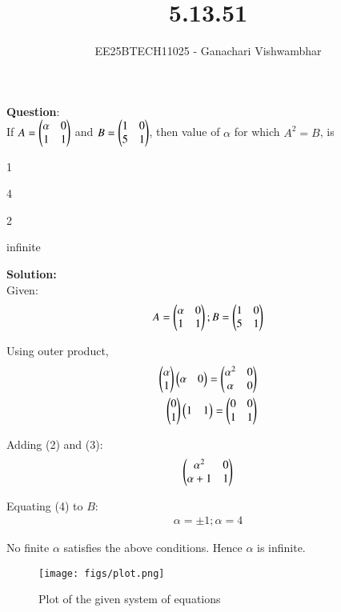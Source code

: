 \documentclass[journal]{IEEEtran}
\begin{document}
\title{5.13.51}
\author{EE25BTECH11025 - Ganachari Vishwambhar}
\maketitle

\textbf{Question}:\\
If $A=\begin{pmatrix}\alpha&0\\1&1\end{pmatrix}$ and $B=\begin{pmatrix}1&0\\5&1\end{pmatrix}$, then value of $\alpha$ for which $A^2=B$, is
\begin{enumerate}
\begin{multicols}{2}
    \item 1
    \item 4
    \item 2
    \item infinite
\end{multicols}
\end{enumerate}
\textbf{Solution: }\\
Given:
\begin{align}
    A = \begin{pmatrix}\alpha&0\\1&1\end{pmatrix};
    B = \begin{pmatrix}1&0\\5&1\end{pmatrix}
\end{align}

Using outer product,
\begin{align}
    \begin{pmatrix}\alpha\\1\end{pmatrix}\begin{pmatrix}\alpha&0\end{pmatrix} = \begin{pmatrix}\alpha^2&0\\\alpha&0\end{pmatrix}\\
    \begin{pmatrix}0\\1\end{pmatrix}\begin{pmatrix}1&1\end{pmatrix} = \begin{pmatrix}0&0\\1&1\end{pmatrix}
\end{align}

Adding (2) and (3):
\begin{align}
    \begin{pmatrix}\alpha^2&0\\\alpha+1&1\end{pmatrix}
\end{align}

Equating (4) to $B$:
\begin{align}
    \alpha = \pm1; \alpha = 4
\end{align}

No finite $\alpha$ satisfies the above conditions. Hence $\alpha$ is infinite.

\begin{figure}[h!]
   \centering
   \texttt{[image: figs/plot.png]}
   \caption{Plot of the given system of equations}
   \label{}
\end{figure}
\end{document}
